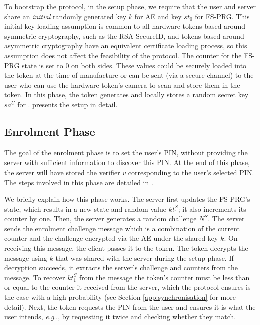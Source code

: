 \documentclass[runningheads]{llncs}
\makeatletter
\DeclareRobustCommand\onedot{\futurelet\@let@token\@onedot}
\def\@onedot{\ifx\@let@token.\else.\null\fi\xspace}
\def\eg{\emph{e.g}\onedot} \def\Eg{\emph{E.g}\onedot}
\newcommand{\sss}{\scriptscriptstyle}
\newcommand{\nonce}{\ensuremath{{N}}}
\newcommand{\keyt}{\ensuremath{{kt}}}
\newcommand{\salt}{\ensuremath{{sa}}}
\renewcommand{\verifier}{\ensuremath{{v}}}
\renewcommand{\state}{\ensuremath{{st}}}
\newcommand{\VC}[1]{\ensuremath{#1^{\sss U}}}
\newcommand{\VS}[1]{\ensuremath{#1^{\sss S}}}
\makeatother
\begin{document}
To bootstrap the protocol, in the setup phase, we require that the user
and server share an \emph{initial} randomly generated key $k$ for AE and key $\state_{\sss 0}$ for  FS-PRG.
This initial key loading assumption is common to all hardware tokens based around symmetric cryptography, such as the RSA SecureID, and tokens based around asymmetric cryptography have an equivalent certificate loading process, so this assumption does not affect the feasibility of the protocol.
The counter for the FS-PRG state is set to $0$ on both sides. 
These values could be securely loaded into the token at the time of
manufacture or can be sent (via a secure channel) to the user who can use the hardware token's camera to scan and store them in the token.
In this phase, the token generates and locally stores a random secret key $\VC{\salt}$ for \prf.   presents the setup in detail. 




\subsection{Enrolment Phase}
\label{sec:enrollment}

The goal of the enrolment phase is to set the user's PIN, without providing the  
 server with sufficient information to discover this PIN. 
% 
  At the end of this phase, the server will have stored the verifier $\verifier$ corresponding to the user's selected PIN.
The steps involved in this phase are detailed in .  







We briefly explain how this phase works.  The server first updates the FS-PRG's state, which results in a new state and random value \VS{\keyt_{\sss 1}}; it also increments its counter by one. Then, the server generates a random challenge \VS{\nonce}. The server sends the enrolment challenge message which is a combination of the current counter and the challenge encrypted via the AE under the shared key $k$.
%
 On receiving this message, the client passes it to the token. The token decrypts the message using $k$ that was shared with the server during the setup phase.  If decryption succeeds, it extracts the server's challenge and counters from the message. To recover $\VS{\keyt_{\sss 1}}$ from the message the token's counter must be less than or equal to the counter it received from the server, which the protocol ensures is the case with a high probability (see Section \ref{app:synchronisation} for more detail). Next, the token requests the PIN from the user and ensures it is what the user intends, \eg, by requesting it twice and checking whether they match.
\end{document}
